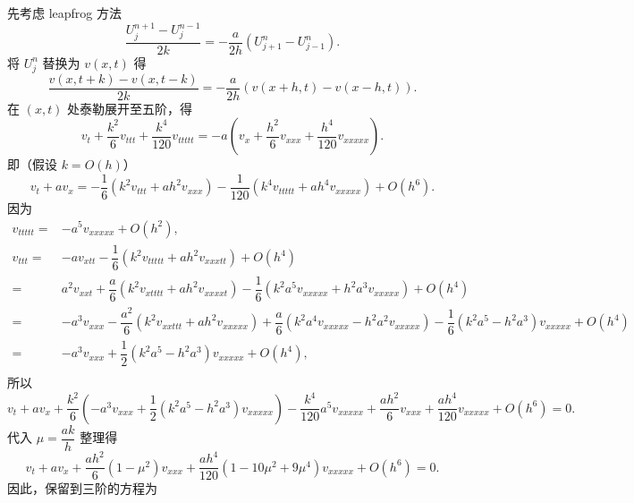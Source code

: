 \documentclass[lang=cn,a4paper,newtx,bibend=bibtex]{elegantpaper}
\begin{document}
\begin{solution}
  先考虑 leapfrog 方法
  \begin{equation*}
    \dfrac{U_j^{n+1} - U_j^{n-1}}{2k} = -\dfrac{a}{2h}(U_{j+1}^n - U_{j-1}^n).
  \end{equation*}
  将 $U_j^n$ 替换为 $v(x,t)$ 得
  \begin{equation*}
    \dfrac{v(x,t+k) - v(x,t-k)}{2k} = -\dfrac{a}{2h}(v(x+h,t) - v(x-h,t)).
  \end{equation*}
  在 $(x,t)$ 处泰勒展开至五阶，得
  \begin{equation*}
    v_t + \dfrac{k^2}6v_{ttt} + \dfrac{k^4}{120}v_{ttttt} = -a\left(v_x + \dfrac{h^2}6v_{xxx} + \dfrac{h^4}{120}v_{xxxxx}\right).
  \end{equation*}
  即（假设 $k=O(h)$）
  \begin{equation*}
    v_t + av_x = -\dfrac 16(k^2v_{ttt} + ah^2v_{xxx}) - \dfrac 1{120}(k^4v_{ttttt} + ah^4v_{xxxxx}) + O(h^6).
  \end{equation*}
  因为
  \begin{equation*}
    \begin{aligned}
      v_{ttttt} = & -a^5v_{xxxxx} + O(h^2), & \\
      v_{ttt} = & -av_{xtt} - \dfrac 16(k^2v_{ttttt} + ah^2v_{xxxtt}) + O(h^4) & \\
      = & a^2v_{xxt} + \dfrac a6(k^2v_{xtttt} + ah^2v_{xxxxt}) - \dfrac 16(k^2a^5v_{xxxxx} + h^2a^3v_{xxxxx}) + O(h^4) & \\
      = & -a^3v_{xxx} - \dfrac {a^2}6(k^2v_{xxttt} + ah^2v_{xxxxx}) + \dfrac a6(k^2a^4v_{xxxxx} - h^2a^2v_{xxxxx}) - \dfrac 16(k^2a^5-h^2a^3)v_{xxxxx} + O(h^4) & \\
      = & -a^3v_{xxx} + \dfrac 12(k^2a^5 - h^2a^3)v_{xxxxx} + O(h^4), & \\
    \end{aligned}
  \end{equation*}
  所以
  \begin{equation*}
    v_t + av_x + \dfrac{k^2}6\left(-a^3v_{xxx} + \dfrac 12(k^2a^5-h^2a^3)v_{xxxxx}\right) - \dfrac{k^4}{120}a^5v_{xxxxx} + \dfrac{ah^2}6v_{xxx} + \dfrac{ah^4}{120}v_{xxxxx} + O(h^6) = 0.
  \end{equation*}
  代入 $\mu = \dfrac{ak}{h}$ 整理得
  \begin{equation*}
    v_t + av_x + \dfrac{ah^2}6(1-\mu^2)v_{xxx} + \dfrac{ah^4}{120}(1-10\mu^2+9\mu^4)v_{xxxxx} + O(h^6) = 0.
  \end{equation*}
  因此，保留到三阶的方程为
  \begin{equation*}

\end{equation*}
\end{solution}
\end{document}
